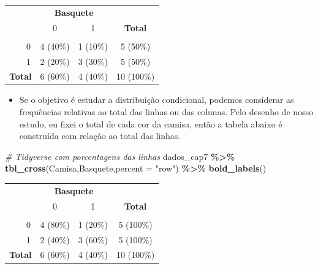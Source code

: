 \documentclass[
]{book}
\newenvironment{Shaded}{\begin{snugshade}}{\end{snugshade}}
\newcommand{\AttributeTok}[1]{\textcolor[rgb]{0.13,0.29,0.53}{#1}}
\newcommand{\CommentTok}[1]{\textcolor[rgb]{0.56,0.35,0.01}{\textit{#1}}}
\newcommand{\FunctionTok}[1]{\textcolor[rgb]{0.13,0.29,0.53}{\textbf{#1}}}
\newcommand{\NormalTok}[1]{#1}
\newcommand{\SpecialCharTok}[1]{\textcolor[rgb]{0.81,0.36,0.00}{\textbf{#1}}}
\newcommand{\StringTok}[1]{\textcolor[rgb]{0.31,0.60,0.02}{#1}}
\providecommand{\tightlist}{%
  \setlength{\itemsep}{0pt}\setlength{\parskip}{0pt}}
\begin{document}
\begin{table}[t]
\fontsize{12.0pt}{14.4pt}\selectfont
\begin{tabular*}{\linewidth}{@{\extracolsep{\fill}}lccc}
\toprule
 & \multicolumn{2}{c}{\textbf{Basquete}} &  \\ 
\cmidrule(lr){2-3}
 & 0 & 1 & \textbf{Total} \\ 
\midrule\addlinespace[2.5pt]
{\bfseries Camisa} &  &  &  \\ 
    0 & 4 (40\%) & 1 (10\%) & 5 (50\%) \\ 
    1 & 2 (20\%) & 3 (30\%) & 5 (50\%) \\ 
{\bfseries Total} & 6 (60\%) & 4 (40\%) & 10 (100\%) \\ 
\bottomrule
\end{tabular*}
\end{table}

\begin{itemize}
\tightlist
\item
  Se o objetivo é estudar a distribuição condicional, podemos considerar as frequências relativas ao total das linhas ou das colunas. Pelo desenho de nosso estudo, eu fixei o total de cada cor da camisa, então a tabela abaixo é construída com relação ao total das linhas.
\end{itemize}

\begin{Shaded}
\begin{Highlighting}[]
\CommentTok{\# Tidyverse com porcentagens das linhas}
\NormalTok{dados\_cap7 }\SpecialCharTok{\%\textgreater{}\%} \FunctionTok{tbl\_cross}\NormalTok{(Camisa,Basquete,}\AttributeTok{percent =} \StringTok{"row"}\NormalTok{) }\SpecialCharTok{\%\textgreater{}\%} 
  \FunctionTok{bold\_labels}\NormalTok{()}
\end{Highlighting}
\end{Shaded}

\begin{table}[t]
\fontsize{12.0pt}{14.4pt}\selectfont
\begin{tabular*}{\linewidth}{@{\extracolsep{\fill}}lccc}
\toprule
 & \multicolumn{2}{c}{\textbf{Basquete}} &  \\ 
\cmidrule(lr){2-3}
 & 0 & 1 & \textbf{Total} \\ 
\midrule\addlinespace[2.5pt]
{\bfseries Camisa} &  &  &  \\ 
    0 & 4 (80\%) & 1 (20\%) & 5 (100\%) \\ 
    1 & 2 (40\%) & 3 (60\%) & 5 (100\%) \\ 
{\bfseries Total} & 6 (60\%) & 4 (40\%) & 10 (100\%) \\ 
\bottomrule
\end{tabular*}
\end{table}
\end{document}
